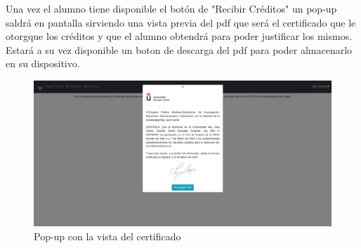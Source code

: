 \documentclass[a4paper, 12pt]{book}
\begin{document}
\begin{enumerate}
  
  Una vez el alumno tiene disponible el botón de "Recibir Créditos" un pop-up saldrá en pantalla sirviendo una vista previa del pdf que será el certificado que le otorgque los créditos y que el alumno obtendrá para poder justificar los mismos. Estará a su vez disponible un boton de descarga del pdf para poder almacenarlo en su dispositivo.
  
      \begin{figure}[H]
  	\centering
  	\includegraphics[width=16cm, keepaspectratio]{img/pdfVisual.png}
  	\caption{Pop-up con la vista del certificado}\label{fig:pdfVisual}
	\end{figure}
  
\end{enumerate}
\end{document}
